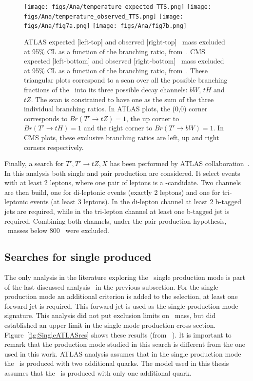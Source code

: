 \begin{figure}[!Hhtbp]
  \begin{center}
    \texttt{[image: figs/Ana/temperature\_expected\_TTS.png]}
    \texttt{[image: figs/Ana/temperature\_observed\_TTS.png]}
    \texttt{[image: figs/Ana/fig7a.png]}
    \texttt{[image: figs/Ana/fig7b.png]}
    \caption{ATLAS expected [left-top] and observed [right-top] \Tp~mass excluded at 95\% CL as a function of the branching ratio, from~\cite{Aad:2015gdg}. CMS expected [left-bottom] and observed [right-bottom] \Tp~mass excluded at 95\% CL as a function of the branching ratio, from~\cite{Chatrchyan:2013uxa}. These triangular plots correspond to a scan over all the possible branching fractions of the \Tp~into its three possible decay channels: $bW$, $tH$ and $tZ$. The scan is constrained to have one as the sum of the three individual branching ratios. In ATLAS plots, the (0,0) corner corresponds to ${Br(T'\rightarrow tZ)=1}$, the up corner to ${Br(T'\rightarrow tH)=1}$ and the right corner to ${Br(T'\rightarrow bW)=1}$. In CMS plots, these exclusive branching ratios are left, up and right corners respectively.}
    \label{fig:ATLASCMSres}
  \end{center}
\end{figure}

Finally, a search for ${T',T'\rightarrow tZ,X}$ has been performed by ATLAS collaboration~\cite{Aad:2014efa}. In this analysis both single and pair production are considered. It select events with at least 2 leptons, where one pair of leptons is a \Z-candidate. Two channels are then build, one for di-leptonic events (exactly 2 leptons) and one for tri-leptonic events (at least 3 leptons). In the di-lepton channel at least 2 b-tagged jets are required, while in the tri-lepton channel at least one b-tagged jet is required. Combining both channels, under the pair production hypothesis, \Tp~masses below 800 \GeVcc~were excluded.

\subsection{Searches for single produced \Tp}
\label{sec:singleanal}

The only analysis in the literature exploring the \Tp~single production mode is part of the last discussed analysis~\cite{Aad:2014efa} in the previous subsection. For the single production mode an additional criterion is added to the selection, at least one forward jet is required. This forward jet is used as the single production mode signature. This analysis did not put exclusion limits on \Tp~mass, but did established an upper limit in the single mode production cross section. Figure~\ref{fig:SingleATLASres} shows these results (from ~\cite{Aad:2014efa}). It is important to remark that the production mode studied in this search is different from the one used in this work. ATLAS analysis assumes that in the single production mode the \Tp~is produced with two additional quarks. The model used in this thesis assumes that the \Tp~is produced with only one additional quark.

